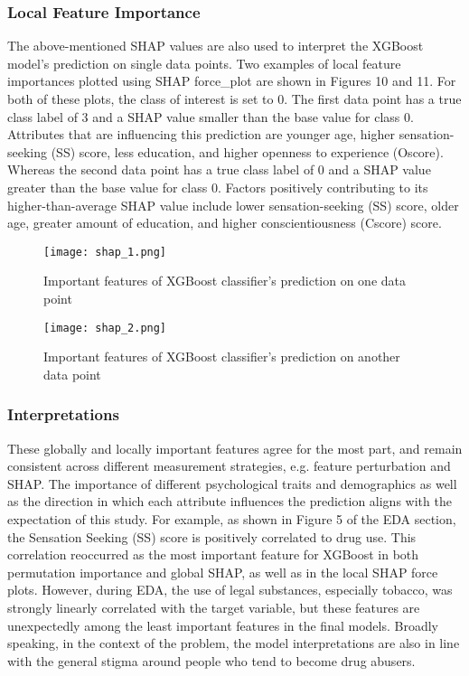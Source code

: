 \documentclass[12pt]{article}
\begin{document}
\subsubsection{Local Feature Importance}
The above-mentioned SHAP values are also used to interpret the XGBoost model's prediction on single data points. Two examples of local feature importances plotted using SHAP force\_plot are shown in Figures 10 and 11. For both of these plots, the class of interest is set to 0. The first data point has a true class label of 3 and a SHAP value smaller than the base value for class 0. Attributes that are influencing this prediction are younger age, higher sensation-seeking (SS) score, less education, and higher openness to experience (Oscore). Whereas the second data point has a true class label of 0 and a SHAP value greater than the base value for class 0. Factors positively contributing to its higher-than-average SHAP value include lower sensation-seeking (SS) score, older age, greater amount of education, and higher conscientiousness (Cscore) score. 
\begin{figure}[!h]
\centering
\texttt{[image: shap\_1.png]}
\caption{Important features of XGBoost classifier's prediction on one data point}
\end{figure}

\begin{figure}[!h]
\centering
\texttt{[image: shap\_2.png]}
\caption{Important features of XGBoost classifier's prediction on another data point}
\end{figure}

\subsubsection{Interpretations}
These globally and locally important features agree for the most part, and remain consistent across different measurement strategies, e.g. feature perturbation and SHAP.  The importance of different psychological traits and demographics as well as the direction in which each attribute influences the prediction aligns with the expectation of this study. For example, as shown in Figure 5 of the EDA section, the Sensation Seeking (SS) score is positively correlated to drug use. This correlation reoccurred as the most important feature for XGBoost in both permutation importance and global SHAP, as well as in the local SHAP force plots. However, during EDA, the use of legal substances, especially tobacco, was strongly linearly correlated with the target variable, but these features are unexpectedly among the least important features in the final models. Broadly speaking, in the context of the problem, the model interpretations are also in line with the general stigma around people who tend to become drug abusers. 
\end{document}
